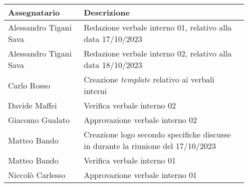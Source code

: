 \begin{center}
{
\renewcommand{\arraystretch}{1.5}
\begin{tabular}{p{0.30\linewidth}|p{0.65\linewidth}}
    \textbf{Assegnatario}    &   \textbf{Descrizione}  \\
    \hline
    Alessandro Tigani Sava  & Redazione verbale interno 01, relativo alla data 17/10/2023   \\
    \hline
    Alessandro Tigani Sava  & Redazione verbale interno 02, relativo alla data 18/10/2023   \\
    \hline
    Carlo Rosso             & Creazione \textit{template} relativo ai verbali interni       \\
    \hline
    Davide Maffei           & Verifica verbale interno 02                                   \\
    \hline
    Giacomo Gualato         & Approvazione verbale interno 02                               \\
    \hline
    Matteo Bando            & Creazione logo secondo specifiche discusse in durante la riunione del 17/10/2023  \\
    \hline
    Matteo Bando            & Verifica verbale interno 01                                   \\
    \hline
    Niccolò Carlesso        & Approvazione verbale interno 01                               \\
\end{tabular}
}
\end{center}
